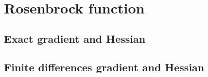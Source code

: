 \section{Rosenbrock function}
\label{sec:rosenbrock_results}

\subsection{Exact gradient and Hessian}

\subsection{Finite differences gradient and Hessian}